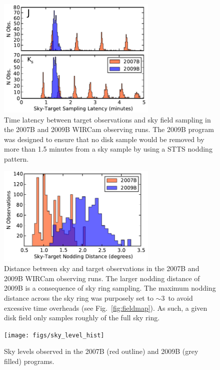 \documentclass[iop]{emulateapj}
\newcommand{\Fig}[1]{Fig.~\ref{fig:#1}}  %
\begin{document}
\begin{figure}[t]
\centering
\includegraphics[width=3in]{figs/sky_target_lag}
\caption{Time latency between target observations and sky field sampling in the 2007B and 2009B WIRCam observing runs.
The 2009B program was designed to ensure that no disk sample would be removed by more than 1.5 minutes from a sky sample by using a STTS nodding pattern.}
\label{fig:sky_target_lag}
\end{figure}

\begin{figure}[t]
\centering
\includegraphics[width=3in]{figs/sky_target_dist}
\caption{Distance between sky and target observations in the 2007B and 2009B WIRCam observing runs.
The larger nodding distance of 2009B is a consequence of sky ring sampling.
The maximum nodding distance across the sky ring was purposely set to $\sim 3$\arcdeg\ to avoid excessive time overheads (see \Fig{fieldmap}).
As such, a given disk field only samples roughly of the full sky ring.}
\label{fig:sky_target_dist}
\end{figure}

\begin{figure}[t]
\centering
\texttt{[image: figs/sky\_level\_hist]}
\caption{Sky levels observed in the 2007B (red outline) and 2009B (grey filled) programs.}
\label{fig:net_sky_level}
\end{figure}
\end{document}
